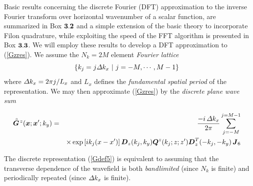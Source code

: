 Basic results concerning the discrete Fourier (DFT) approximation to the inverse 
Fourier transform over horizontal wavenumber of a scalar function,
 are summarized in {\sc Box} $\bf 3.2$ and a simple extension of the 
 basic theory to incorporate Filon quadrature, while exploiting the speed 
 of the FFT algorithm is presented in {\sc Box} $\bf 3.3$. 
We will employ these results to develop a DFT approximation to (\ref{Gzres}).  
We assume the $N_k=2 M$ element {\em Fourier lattice\/}  
\begin{equation} \label{pspec}
\left\{ 
 {k}_{j} =j {\mit \Delta} k_{x} \ |\  j=-M,\cdots ,M-1 
\right\} 
\end{equation} 
where ${\mit \Delta} k_{x} =2 \pi  j/L_{x}$ and   $L_{x}$ defines the {\em fundamental spatial period\/} 
of the representation.
We may then approximate (\ref{Gzres}) by the {\em discrete 
plane wave sum\/}
\begin{samepage}
\begin{eqnarray} \label{Gdef5}
\stackrel{\scriptscriptstyle _{\,\,\circ}}{ \mbox{\boldmath$\mit G$\unboldmath}}\!{}^{z}({\mbox{\boldmath$\mit x$\unboldmath}};{\mbox{\boldmath$\mit x$\unboldmath}}^{\prime};k_y)&=&\frac{- i\,{\mit \Delta} {k}_{x}}{2 \pi} 
\sum\limits_{{j=-M}}^{j=M-1}
\nonumber\\
&&\times
\exp \left[i {k}_{j} ({ x}-{ 
x}^{\prime})\right] {\mbox{\boldmath$\mit D$\unboldmath}}_{z}({k}_{j},{k}_{y})
{\mbox{\boldmath$\mit Q$\unboldmath}}^{z}({k}_{j};z;z^{\prime}){\mbox{\boldmath$\mit D$\unboldmath}}_{z}^{T}(-{k}_{j},-{k}_{y})
\,{\mbox{\boldmath$\mit J$\unboldmath}}_6
\end{eqnarray} 
\end{samepage}
The discrete representation (\ref{Gdef5}) is equivalent to assuming that the 
transverse dependence of the wavefield is both {\em  bandlimited\/} 
(since $N_k$ is 
finite) and periodically repeated (since ${\mit \Delta} {k}_{x}$ is finite).



